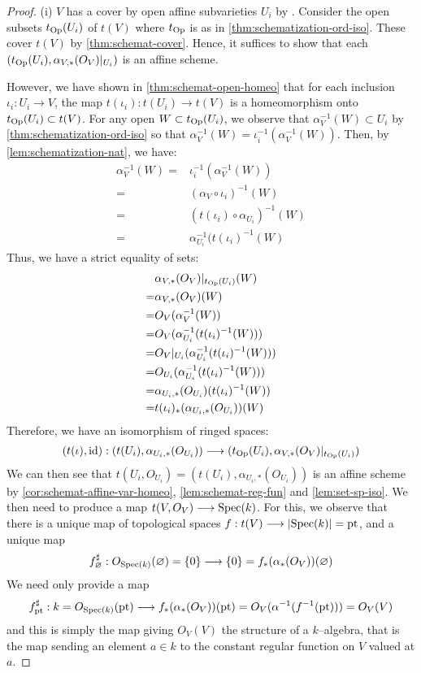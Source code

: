 \begin{proof}
(i)
$V$ has a cover by open affine subvarieties $U_i$ by \cite[\S I.4.3]{HartAG}.
Consider the open subsets $t_{\mathrm{Op}}(U_i)$ of $t(V)$ where
$t_{\mathrm{Op}}$ is as in \cref{thm:schematization-ord-iso}.
These cover $t(V)$ by \cref{thm:schemat-cover}. Hence,
it suffices to show that each $(t_{\mathrm{Op}}(U_i), \alpha_{V, *}(O_V)|_{U_i})$
is an affine scheme.

However, we have shown in \cref{thm:schemat-open-homeo} that
for each inclusion $\iota_i : U_i \to V$, the map
$t(\iota_i) : t(U_i) \to t(V)$ is a homeomorphism onto
$t_{\mathrm{Op}}(U_i) \subset t(V)$.
For any open $W \subset t_{\mathrm{Op}}(U_i)$, we observe that
$\alpha_{V}^{-1}(W) \subset U_i$ by \cref{thm:schematization-ord-iso}
so that $\alpha_V^{-1}(W) = \iota_i^{-1}(\alpha_{V}^{-1}(W))$. Then,
by \cref{lem:schematization-nat}, we have:
\begin{align*}
\alpha_V^{-1}(W)
=& \iota_i^{-1}(\alpha_V^{-1}(W)) \\
=& (\alpha_V \circ \iota_i)^{-1}(W) \\
=& (t(\iota_i) \circ \alpha_{U_i})^{-1}(W) \\
=& \alpha_{U_i}^{-1}(t(\iota_i)^{-1}(W)
\end{align*}
Thus, we have a strict equality of sets:
\begin{align*}
 & \alpha_{V, *}(O_V)|_{t_{\mathrm{Op}}(U_i)}(W) \\
=& \alpha_{V, *}(O_V)(W) \\
=& O_V(\alpha_{V}^{-1}(W)) \\
=& O_V(\alpha_{U_i}^{-1}(t(\iota_i)^{-1}(W))) \\
=& O_V|_{U_i}(\alpha_{U_i}^{-1}(t(\iota_i)^{-1}(W))) \\
=& O_{U_i}(\alpha_{U_i}^{-1}(t(\iota_i)^{-1}(W))) \\
=& \alpha_{U_i, *}(O_{U_i})(t(\iota_i)^{-1}(W)) \\
=& t(\iota_i)_*(\alpha_{U_i, *}(O_{U_i}))(W)
\end{align*}
Therefore, we have an isomorphism of ringed spaces:
\[
(t(\iota), \id) : (t(U_i), \alpha_{U_i, *}(O_{U_i})) \to
                    (t_\Op(U_i), \alpha_{V, *}(O_V)|_{t_\Op(U_i)})
\]
We can then see that
$t(U_i, O_{U_i}) = (t(U_i), \alpha_{U_i, *}(O_{U_i}))$ is an affine scheme
by \cref{cor:schemat-affine-var-homeo}, \cref{lem:schemat-reg-fun}
and \cref{lem:set-sp-iso}.
We then need to produce a map $t(V, O_V) \to \Spec(k)$.
For this, we observe that there is a unique map of topological spaces
$f : t(V) \to |\Spec(k)| = \mathrm{pt}$, and a unique map
\[
f^\sharp_{\varnothing} : O_{\Spec(k)}(\varnothing) = \set{0}
\to \set{0} = f_*(\alpha_*(O_V))(\varnothing)
\]
We need only provide a map
\[
f^\sharp_\mathrm{pt} :
k = O_{\Spec(k)}(\mathrm{pt}) \to f_*(\alpha_*(O_V))(\mathrm{pt})
= O_V(\alpha^{-1}(f^{-1}(\mathrm{pt}))) = O_V(V)
\]
and this is simply the map giving $O_V(V)$ the structure of a $k$--algebra,
that is the map sending an element $a \in k$ to the constant regular
function on $V$ valued at $a$.


\end{proof}
